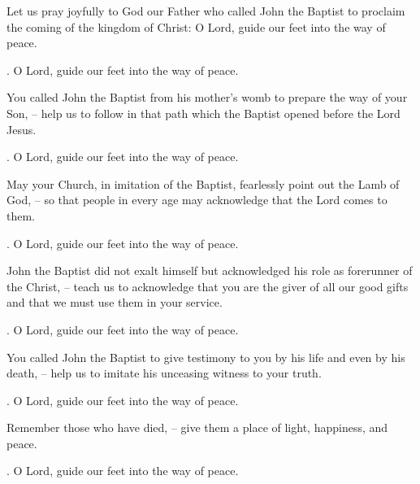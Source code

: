 \lettrine[loversize=0.15,lines=2]{L}{}et us pray joyfully to God our Father who called John the Baptist to proclaim the coming of the kingdom of Christ: O Lord, guide our feet into the way of peace.
\par \Rbar. O Lord, guide our feet into the way of peace.

You called John the Baptist from his mother’s womb to prepare the way of your Son,
– help us to follow in that path which the Baptist opened before the Lord Jesus.
\par \Rbar. O Lord, guide our feet into the way of peace.

May your Church, in imitation of the Baptist, fearlessly point out the Lamb of God,
– so that people in every age may acknowledge that the Lord comes to them.
\par \Rbar. O Lord, guide our feet into the way of peace.

John the Baptist did not exalt himself but acknowledged his role as forerunner of the Christ,
– teach us to acknowledge that you are the giver of all our good gifts and that we must use them in your service.
\par \Rbar. O Lord, guide our feet into the way of peace.

You called John the Baptist to give testimony to you by his life and even by his death,
– help us to imitate his unceasing witness to your truth.
\par \Rbar. O Lord, guide our feet into the way of peace.

Remember those who have died,
– give them a place of light, happiness, and peace.
\par \Rbar. O Lord, guide our feet into the way of peace.
